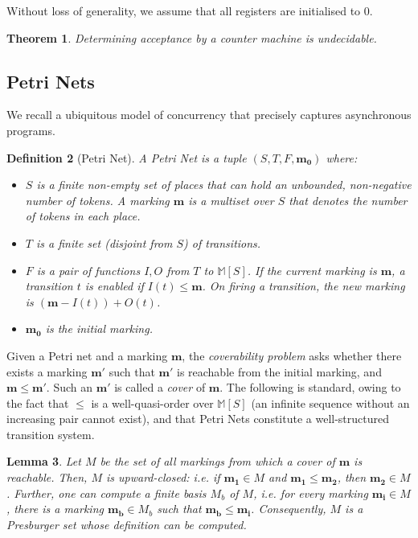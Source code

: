 \documentclass{article}
\newtheorem{definition}{Definition}[section]
\newtheorem{theorem}[definition]{Theorem}
\newtheorem{lemma}[definition]{Lemma}
\theoremstyle{remark}
\newcommand{\multisets}{\mathbb{M}}
\begin{document}
Without loss of generality, we assume that all registers are initialised to $0$.

\begin{theorem}
Determining acceptance by a counter machine is undecidable.
\end{theorem}

\subsection{Petri Nets}
We recall a ubiquitous model of concurrency that precisely captures asynchronous programs. 
\begin{definition}[Petri Net]
A Petri Net is a tuple $(S, T, F, \mathbf{m_0})$ where:
\begin{itemize}
\item $S$ is a finite non-empty set of places that can hold an unbounded, non-negative number of tokens. A marking $\mathbf{m}$ is a multiset over $S$ that denotes the number of tokens in each place.
\item $T$ is a finite set (disjoint from $S$) of transitions.
\item $F$ is a pair of functions $I, O$ from $T$ to $\multisets[S]$. If the current marking is $\mathbf{m}$, a transition $t$ is enabled if $I(t) \le \mathbf{m}$. On firing a transition, the new marking is $(\mathbf{m} - I(t)) + O(t)$.
\item $\mathbf{m_0}$ is the initial marking.
\end{itemize}
\end{definition}

Given a Petri net and a marking $\mathbf{m}$, the \emph{coverability problem} asks whether there exists a marking $\mathbf{m'}$ such that $\mathbf{m'}$ is reachable from the initial marking, and $\mathbf{m} \le \mathbf{m'}$. Such an $\mathbf{m'}$ is called a \emph{cover} of $\mathbf{m}$. The following is standard, owing to the fact that $\le$ is a well-quasi-order over $\multisets[S]$ (an infinite sequence without an increasing pair cannot exist), and that Petri Nets constitute a well-structured transition system.

\begin{lemma}
\label{lem:cover}
Let $M$ be the set of all markings from which a cover of $\mathbf{m}$ is reachable. Then, $M$ is upward-closed: i.e. if $\mathbf{m_1} \in M$ and $\mathbf{m_1} \le \mathbf{m_2}$, then $\mathbf{m_2} \in M$. Further, one can compute a finite basis $M_b$ of $M$, i.e. for every marking $\mathbf{m_i} \in M$, there is a marking $\mathbf{m_b} \in M_b$ such that $\mathbf{m_b} \le \mathbf{m_i}$. Consequently, $M$ is a Presburger set whose definition can be computed.
\end{lemma}
\end{document}
